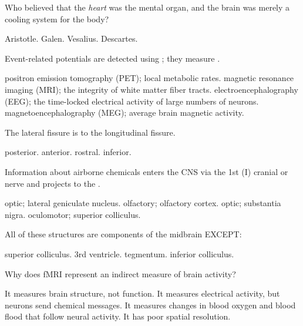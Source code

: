 \documentclass[answers]{exam}
\begin{document}
\begin{questions}
\question Who believed that the \emph{heart} was the mental organ, and the brain was merely a cooling system for the body?
\begin{choices}
\choice Aristotle.
\choice Galen.
\choice Vesalius.
\correctchoice Descartes.
\end{choices}

\newpage

\question Event-related potentials are detected using \fillin; they measure \fillin.
\begin{choices}
\choice positron emission tomography (PET); local metabolic rates.
\choice magnetic resonance imaging (MRI); the integrity of white matter fiber tracts.
\correctchoice electroencephalography (EEG); the time-locked electrical activity of large numbers of neurons.
\choice magnetoencephalography (MEG); average brain magnetic activity.
\end{choices}

\question The lateral fissure is \fillin to the longitudinal fissure.
\begin{choices}
\choice posterior.
\choice anterior.
\choice rostral.
\correctchoice inferior.
\end{choices}

\question Information about airborne chemicals enters the CNS via the 1st (I) cranial or \fillin nerve and projects to the \fillin.
\begin{choices}
\choice optic; lateral geniculate nucleus.
\correctchoice olfactory; olfactory cortex.
\choice optic; substantia nigra.
\choice oculomotor; superior colliculus.
\end{choices}


\question All of these structures are components of the midbrain EXCEPT:
\begin{choices}
\choice superior colliculus.
\correctchoice 3rd ventricle.
\choice tegmentum.
\choice inferior colliculus.
\end{choices}

\question Why does fMRI represent an indirect measure of brain activity?
\begin{choices}
\choice It measures brain structure, not function.
\choice It measures electrical activity, but neurons send chemical messages.
\correctchoice It measures changes in blood oxygen and blood flood that follow neural activity.
\choice It has poor spatial resolution.
\end{choices}


\end{questions}
\end{document}
